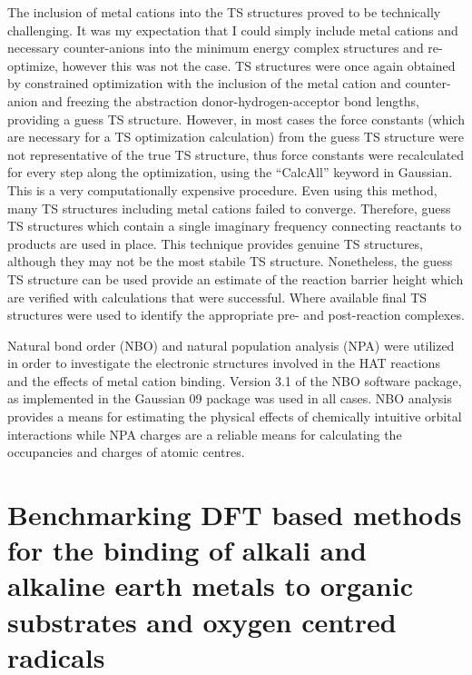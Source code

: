 The inclusion of metal cations into the TS structures proved to be technically challenging. It was my expectation that I could simply include metal cations and necessary counter-anions into the minimum energy complex structures and re-optimize, however this was not the case. TS structures were once again obtained by constrained optimization with the inclusion of the metal cation and counter-anion and freezing the abstraction donor-hydrogen-acceptor bond lengths, providing a guess TS structure. However, in most cases the force constants (which are necessary for a TS optimization calculation) from the guess TS structure were not representative of the true TS structure, thus force constants were recalculated for every step along the optimization, using the ``CalcAll'' keyword in Gaussian. This is a very computationally expensive procedure. Even using this method, many TS structures including metal cations failed to converge. Therefore, guess TS structures which contain a single imaginary frequency connecting reactants to products are used in place. This technique provides genuine TS structures, although they may not be the most stabile TS structure. Nonetheless, the guess TS structure can be used provide an estimate of the reaction barrier height which are verified with calculations that were successful. Where available final TS structures were used to identify the appropriate pre- and post-reaction complexes.

Natural bond order (NBO) and natural population analysis (NPA) were utilized in order to investigate the electronic structures involved in the HAT reactions and the effects of metal cation binding.\cite{Reed1983, Reed1985, Glendening2012} Version 3.1 of the NBO software package,\cite{NBO3} as implemented in the Gaussian 09 package was used in all cases.\cite{Frisch2009} NBO analysis provides a means for estimating the physical effects of chemically intuitive orbital interactions while NPA charges are a reliable means for calculating the occupancies and charges of atomic centres.\cite{Landis2014, Weinhold2016}

\section{Benchmarking DFT based methods for the binding of alkali and alkaline earth metals to organic substrates and oxygen centred radicals}
\label{sec:benchmark}

